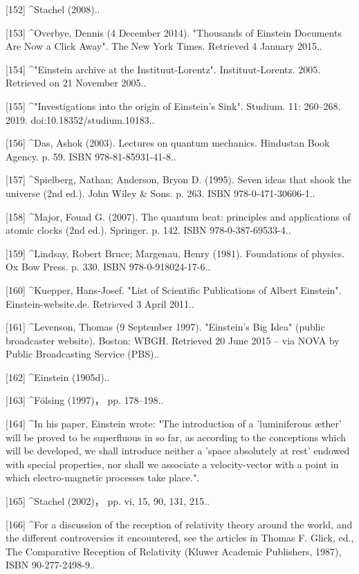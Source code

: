 [152]
^Stachel (2008)..

[153]
^Overbye, Dennis (4 December 2014). "Thousands of Einstein Documents Are Now a Click Away". The New York Times. Retrieved 4 January 2015..

[154]
^"Einstein archive at the Instituut-Lorentz". Instituut-Lorentz. 2005. Retrieved on 21 November 2005..

[155]
^"Investigations into the origin of Einstein's Sink". Studium. 11: 260–268. 2019. doi:10.18352/studium.10183..

[156]
^Das, Ashok (2003). Lectures on quantum mechanics. Hindustan Book Agency. p. 59. ISBN 978-81-85931-41-8..

[157]
^Spielberg, Nathan; Anderson, Bryon D. (1995). Seven ideas that shook the universe (2nd ed.). John Wiley & Sons. p. 263. ISBN 978-0-471-30606-1..

[158]
^Major, Fouad G. (2007). The quantum beat: principles and applications of atomic clocks (2nd ed.). Springer. p. 142. ISBN 978-0-387-69533-4..

[159]
^Lindsay, Robert Bruce; Margenau, Henry (1981). Foundations of physics. Ox Bow Press. p. 330. ISBN 978-0-918024-17-6..

[160]
^Kuepper, Hans-Josef. "List of Scientific Publications of Albert Einstein". Einstein-website.de. Retrieved 3 April 2011..

[161]
^Levenson, Thomas (9 September 1997). "Einstein's Big Idea" (public broadcaster website). Boston: WBGH. Retrieved 20 June 2015 – via NOVA by Public Broadcasting Service (PBS)..

[162]
^Einstein (1905d)..

[163]
^Fölsing (1997)， pp. 178–198..

[164]
^In his paper, Einstein wrote: "The introduction of a 'luminiferous æther' will be proved to be superfluous in so far, as according to the conceptions which will be developed, we shall introduce neither a 'space absolutely at rest' endowed with special properties, nor shall we associate a velocity-vector with a point in which electro-magnetic processes take place.".

[165]
^Stachel (2002)， pp. vi, 15, 90, 131, 215..

[166]
^For a discussion of the reception of relativity theory around the world, and the different controversies it encountered, see the articles in Thomas F. Glick, ed., The Comparative Reception of Relativity (Kluwer Academic Publishers, 1987), ISBN 90-277-2498-9..

